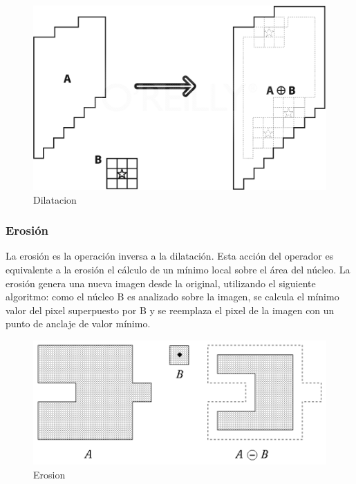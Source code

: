 \begin{figure}[hbtp]
\caption{Dilatacion}
\centering
\includegraphics[scale=0.3]{imagenes/erosion-model.png}
\end{figure}


\subsubsection{Erosión}
La erosión es la operación inversa a la dilatación. Esta acción del operador es equivalente a la erosión el cálculo de un mínimo local sobre el área del núcleo. La erosión genera una nueva imagen desde la original, utilizando el siguiente algoritmo: como el núcleo B es analizado sobre la imagen, se calcula el mínimo valor del pixel superpuesto por B y se reemplaza el pixel de la imagen con un punto de anclaje de valor mínimo. 

\begin{figure}[hbtp]
\caption{Erosion}
\centering
\includegraphics[scale=1]{imagenes/erosion.png}
\end{figure}
